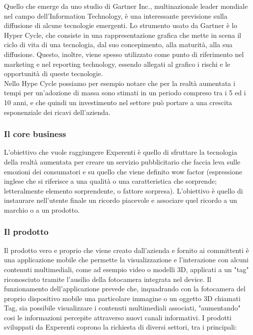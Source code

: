 Quello che emerge da uno studio di Gartner Inc., multinazionale leader mondiale nel campo dell’Information Technology, è una interessante previsione sulla diffusione di alcune tecnologie emergenti. Lo strumento usato da Gartner è lo Hyper Cycle, che consiste in una rappresentazione grafica che mette in scena il ciclo di vita di una tecnologia, dal suo concepimento, alla maturità, alla sua diffusione. Questo, inoltre, viene spesso utilizzato come punto di riferimento nel marketing e nel reporting technology, essendo allegati al grafico i rischi e le opportunità di queste tecnologie.
\\
Nello Hype Cycle possiamo per esempio notare che per la realt\`a aumentata i tempi per un’adozione di massa sono stimati in un periodo compreso tra i 5 ed i 10 anni, e che quindi un investimento nel settore pu\`o portare a una crescita esponenziale dei ricavi dell'azienda. 

\subsubsection{Il core business}
L'obiettivo che vuole raggiungere Experenti \`e quello di sfruttare la tecnologia della realt\`a aumentata per creare un servizio pubblicitario che faccia leva sulle emozioni dei consumatori e su quello che viene definito wow factor (espressione inglese che si riferisce a una qualit\`a o una caratteristica che sorprende; letteralmente elemento sorprendente, o fattore sorpresa). L'obiettivo \`e quello di instaurare nell'utente finale un ricordo piacevole e associare quel ricordo a un marchio o a un prodotto.

\subsubsection{Il prodotto}
Il prodotto vero e proprio che viene creato dall'azienda e fornito ai committenti \`e una applicazione mobile che permette la visualizzazione e l'interazione con alcuni contenuti multimediali, come ad esempio video o modelli 3D, applicati a un "tag" riconosciuto tramite l'ausilio della fotocamera integrata nel device.
Il funzionamento dell'applicazione prevede che, inquadrando con la fotocamera del proprio dispositivo mobile una particolare immagine o un oggetto 3D chiamati Tag, sia possibile visualizzare i contenuti multimediali associati, "aumentando" cosi le informazioni percepite attraverso nuovi canali informativi.
I prodotti sviluppati da Experenti coprono la richiesta di diversi settori, tra i principali:

